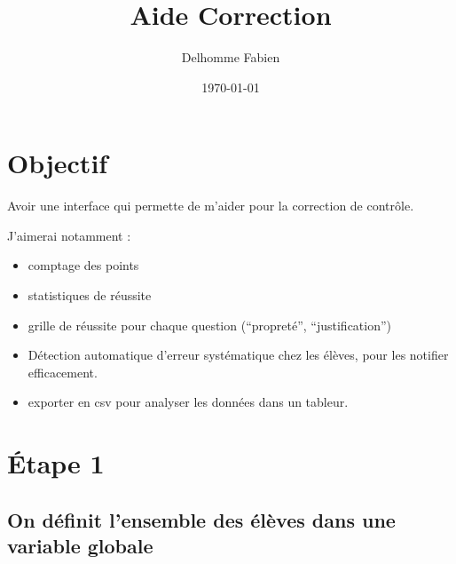 \documentclass[a4paper, 11pt, DIV=18]{scrartcl}
\author{Delhomme Fabien}
\date{\today}
\title{Aide Correction}
\begin{document}
\maketitle

\section{Objectif}
\label{sec:org838467c}

Avoir une interface qui permette de m'aider pour la correction de contrôle.

J'aimerai notamment :

\begin{itemize}
\item comptage des points
\item statistiques de réussite
\item grille de réussite pour chaque question (``propreté'', ``justification'')
\item Détection automatique d'erreur systématique chez les élèves, pour les notifier
efficacement.
\item exporter en csv pour analyser les données dans un tableur.
\end{itemize}

\section{Étape 1}
\label{sec:orgb40b5c9}

\subsection{On définit l'ensemble des élèves dans une variable globale}
\label{sec:orged30cbe}
\end{document}
